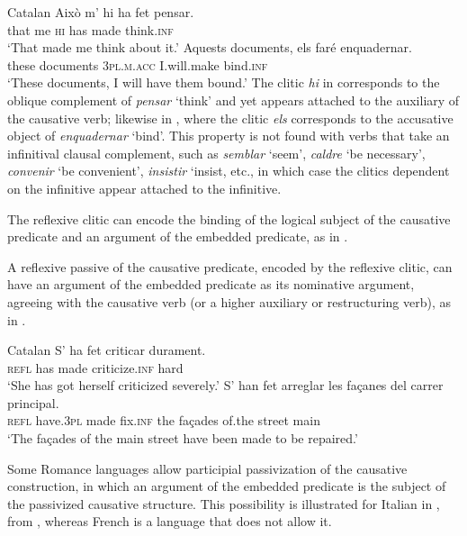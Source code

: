 \documentclass[output=paper,hidelinks]{langscibook}
\begin{document}
\ea\label{ex:Romance:52} Catalan
\ea\label{ex:Romance:52a}
\gll
Això m' hi ha fet pensar.\\
that me \textsc{hi} has made think.\textsc{inf}\\
\glt   `That made me think about it.'
\ex\label{ex:Romance:52b}
\gll
Aquests documents, els faré enquadernar.\\
 these documents \textsc{3pl.m.acc} I.will.make bind.\textsc{inf}\\
\glt`These documents, I will have them bound.'
\z\z       
The clitic \textit{hi} in  corresponds to the oblique complement of \textit{pensar} `think' and yet appears attached to the auxiliary of the causative verb; likewise in , where the clitic \textit{els} corresponds to the accusative object of \textit{enquadernar} `bind'. This property is not found with verbs that take an infinitival clausal complement, such as \textit{semblar} `seem', \textit{caldre} `be necessary', \textit{convenir} `be convenient', \textit{insistir} `insist, etc., in which case the clitics dependent on the infinitive appear attached to the infinitive.

 The reflexive clitic can encode the binding of the logical subject of the causative predicate and an argument of the embedded predicate, as in .

 A reflexive passive of the causative predicate, encoded by the reflexive clitic, can have an argument of the embedded predicate as its nominative argument, agreeing with the causative verb (or a higher auxiliary or restructuring verb), as in .

\ea\label{ex:Romance:53} Catalan
\ea\label{ex:Romance:53a}
\gll S' ha fet criticar durament.\\
       \textsc{refl} has made criticize.\textsc{inf} hard\\
\glt   `She has got herself criticized severely.'
\ex\label{ex:Romance:53b}
\gll
 S' han fet arreglar les façanes del carrer principal.\\
       \textsc{refl} have.\textsc{3pl} made fix.\textsc{inf} the façades of.the street main\\
\glt   `The façades of the main street have been made to be repaired.'\z\z

 Some Romance languages allow participial passivization of the causative construction, in which an argument of the embedded predicate is the subject of the passivized causative structure. This possibility is illustrated for Italian in , from \citet{Frank:96}, whereas French is a language that does not allow it.
\end{document}
